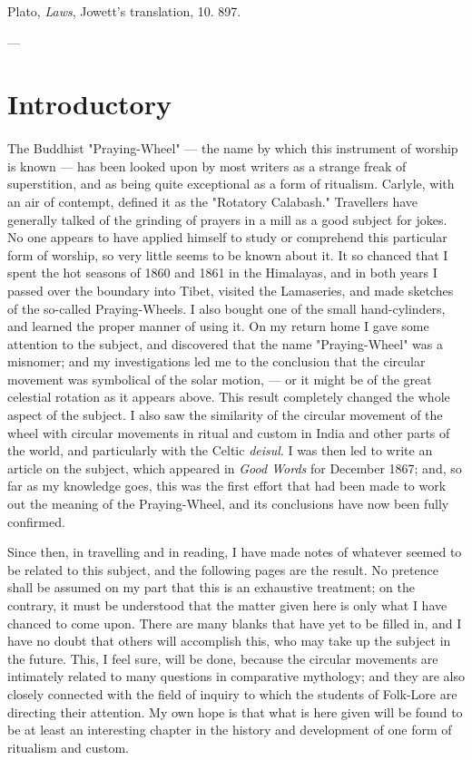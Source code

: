 \documentclass[a4paper, 11pt, oneside, polutonikogreek, english]{article}
\begin{document}
Plato, \emph{Laws}, Jowett's translation, 10. 897.

---
\clearpage
\section*{Introductory}
\paragraph{}
The Buddhist "Praying-Wheel" --- the name by which this instrument of worship is known --- has been looked upon by most writers as a strange freak of superstition, and as being quite exceptional as a form of ritualism. Carlyle, with an air of contempt, defined it as the "Rotatory Calabash." Travellers have generally talked of the grinding of prayers in a mill as a good subject for jokes. No one appears to have applied himself to study or comprehend this particular form of worship, so very little seems to be known about it. It so chanced that I spent the hot seasons of 1860 and 1861 in the Himalayas, and in both years I passed over the boundary into Tibet, visited the Lamaseries, and made sketches of the so-called Praying-Wheels. I also bought one of the small hand-cylinders, and learned the proper manner of using it. On my return home I gave some attention to the subject, and discovered that the name "Praying-Wheel" was a misnomer; and my investigations led me to the conclusion that the circular movement was symbolical of the solar motion, --- or it might be of the great celestial rotation as it appears above. This result completely changed the whole aspect of the subject. I also saw the similarity of the circular movement of the wheel with circular movements in ritual and custom in India and other parts of the world, and particularly with the Celtic \emph{deisul}. I was then led to write an article on the subject, which appeared in \emph{Good Words} for December 1867; and, so far as my knowledge goes, this was the first effort that had been made to work out the meaning of the Praying-Wheel, and its conclusions have now been fully confirmed.

Since then, in travelling and in reading, I have made notes of whatever seemed to be related to this subject, and the following pages are the result. No pretence shall be assumed on my part that this is an exhaustive treatment; on the contrary, it must be understood that the matter given here is only what I have chanced to come upon. There are many blanks that have yet to be filled in, and I have no doubt that others will accomplish this, who may take up the subject in the future. This, I feel sure, will be done, because the circular movements are intimately related to many questions in comparative mythology; and they are also closely connected with the field of inquiry to which the students of Folk-Lore are directing their attention. My own hope is that what is here given will be found to be at least an interesting chapter in the history and development of one form of ritualism and custom.
\end{document}
